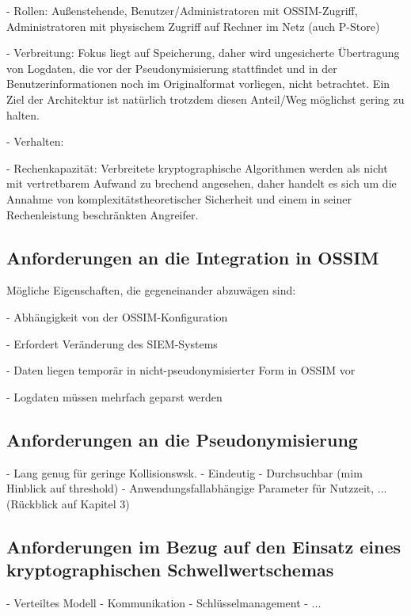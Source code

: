 - Rollen: Außenstehende, Benutzer/Administratoren mit OSSIM-Zugriff, Administratoren mit physischem Zugriff auf Rechner im Netz (auch P-Store)

- Verbreitung: Fokus liegt auf Speicherung, daher wird ungesicherte Übertragung von Logdaten, die vor der Pseudonymisierung stattfindet und in der Benutzerinformationen noch im Originalformat vorliegen, nicht betrachtet. Ein Ziel der Architektur ist natürlich trotzdem diesen Anteil/Weg möglichst gering zu halten.

- Verhalten: 

- Rechenkapazität: Verbreitete kryptographische Algorithmen werden als nicht mit vertretbarem Aufwand zu brechend angesehen, daher handelt es sich um die Annahme von komplexitätstheoretischer Sicherheit und einem in seiner Rechenleistung beschränkten Angreifer.






\subsection*{Anforderungen an die Integration in OSSIM}

Mögliche Eigenschaften, die gegeneinander abzuwägen sind:

- Abhängigkeit von der OSSIM-Konfiguration

- Erfordert Veränderung des SIEM-Systems

- Daten liegen temporär in nicht-pseudonymisierter Form in OSSIM vor

- Logdaten müssen mehrfach geparst werden


\subsection*{Anforderungen an die Pseudonymisierung}

- Lang genug für geringe Kollisionswsk.
- Eindeutig
- Durchsuchbar (mim Hinblick auf threshold)
- Anwendungsfallabhängige Parameter für Nutzzeit, ... (Rückblick auf Kapitel 3)

\subsection*{Anforderungen im Bezug auf den Einsatz eines kryptographischen Schwellwertschemas}

- Verteiltes Modell 
- Kommunikation
- Schlüsselmanagement
- ...



